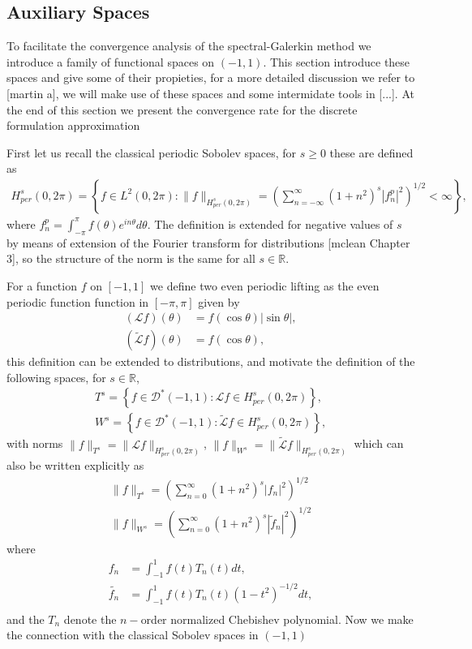 \documentclass{article}
\newcommand{\todo}[1]{{\color{red}[#1]}}
\newcommand{\IR}{{\mathbb R}}
\begin{document}
\subsection{Auxiliary Spaces}
To facilitate the convergence analysis of the spectral-Galerkin method we introduce a family of functional spaces on $(-1,1)$. This section introduce these spaces and give some of their propieties, for a more detailed discussion we refer to \todo{martin a}, we will make use of these spaces and some intermidate tools in \todo{...}. At the end of this section we present the convergence rate for the discrete formulation approximation

First let us recall the classical periodic Sobolev spaces, for $s \geq 0$ these are  defined as 
\begin{align*}
H^s_{per}(0,2\pi) = \left\lbrace f \in L^2(0,2\pi) : \| f \|_{H^s_{per}(0,2\pi)} = \left( \sum_{n = -\infty}^{\infty} (1+n^2)^s | f^p_n|^2 \right)^{1/2} < \infty \right\rbrace,  
\end{align*}
where $f^p_n = \int_{-\pi}^{\pi}f(\theta) e^{i n \theta} d\theta$. The definition is extended for negative values of $s$ by means of extension of the Fourier transform for distributions \todo{mclean Chapter 3}, so the structure of the norm is the same for all $s \in \IR$.

For a function $f$ on $[-1,1]$ we define two even periodic lifting as the even periodic function function in $[-\pi,\pi]$ given by
\begin{align*}
(\mathcal{L}f)(\theta) &= f(\cos \theta) | \sin \theta|,\\
(\widetilde{\mathcal{L}}f)(\theta) &= f(\cos \theta), 
\end{align*}
this definition can be extended to distributions, and motivate the definition of the following spaces, for $s \in \IR$,  
\begin{align*}
T^s = \left\lbrace f \in \mathcal{D}^*(-1,1) : \mathcal{L}f \in H^s_{per}(0,2\pi) \right\rbrace,\\
W^s = \left\lbrace f \in \mathcal{D}^*(-1,1) : \widetilde{\mathcal{L}}f \in H^s_{per}(0,2\pi) \right\rbrace,  
\end{align*}
with norms $\|f \|_{T^s} = \| \mathcal{L} f \|_{H^s_{per}(0,2\pi)}$, $\|f \|_{W^s} = \| \widetilde{\mathcal{L}} f \|_{H^s_{per}(0,2\pi)}$ which can also be written explicitly as \begin{align*}
\|f \|_{T^s} = \left( \sum_{n=0}^\infty (1+n^2)^s |f_n|^2 \right)^{1/2} \\
\|f \|_{W^s} = \left( \sum_{n=0}^\infty (1+n^2)^s |\widetilde{f}_n|^2 \right)^{1/2}
\end{align*}
where  \begin{align*}
f_n &= \int_{-1}^1 f(t) T_n(t) dt,\\
\widetilde{f_n} &= \int_{-1}^1 f(t) T_n(t) (1-t^2)^{-1/2} dt,\\
\end{align*} 
and the $T_n$ denote the $n-$order normalized Chebishev polynomial. 
 Now we make the connection with the classical Sobolev spaces in $(-1,1)$
\end{document}
